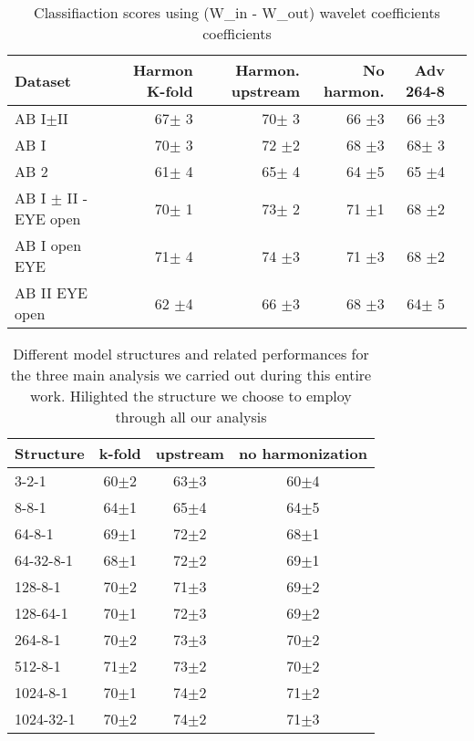 \documentclass[a4paper,11pt]{article}
\begin{document}
\begin{table}[!htp]\centering
\scriptsize
\begin{tabular}{lrrrrr}\toprule
Dataset &Harmon K-fold &Harmon. upstream &No harmon. &Adv 264-8 \\\midrule
AB I$\pm$II &67$\pm$ 3 &70$\pm$ 3 &66 $\pm$3 &66 $\pm$3 \\
AB I &70$\pm$ 3 &72 $\pm$2 &68 $\pm$3 &68$\pm$ 3 \\
AB 2 &61$\pm$ 4 &65$\pm$ 4 &64 $\pm$5 &65 $\pm$4 \\
AB I $\pm$ II - EYE open &70$\pm$ 1 &73$\pm$ 2 &71 $\pm$1 &68 $\pm$2 \\
AB I open EYE &71$\pm$ 4 &74 $\pm$3 &71 $\pm$3 &68 $\pm$2 \\
AB II EYE open &62 $\pm$4 &66 $\pm$3 &68 $\pm$3 &64$\pm$ 5 \\
\bottomrule
\end{tabular}
\caption{Classifiaction scores using (W\_in - W\_out) wavelet coefficients coefficients}
\label{tab:classification_win-wout}
\end{table}





\begin{table}[!htp]\centering
\begin{tabular}{lccc}
\toprule
Structure &k-fold &upstream &no harmonization \\
\midrule
3-2-1 &60$\pm$2 &63$\pm$3 &60$\pm$4 \\
8-8-1 &64$\pm$1 &65$\pm$4 &64$\pm$5 \\
64-8-1 &69$\pm$1 &72$\pm$2 &68$\pm$1 \\
64-32-8-1 &68$\pm$1 &72$\pm$2 &69$\pm$1 \\
128-8-1 &70$\pm$2 &71$\pm$3 &69$\pm$2 \\
128-64-1 &70$\pm$1 &72$\pm$3 &69$\pm$2 \\
\cellcolor[HTML]{ffff00}264-8-1 &\cellcolor[HTML]{ffff00}70$\pm$2 &\cellcolor[HTML]{ffff00}73$\pm$3 &\cellcolor[HTML]{ffff00}70$\pm$2 \\
512-8-1 &71$\pm$2 &73$\pm$2 &70$\pm$2 \\
1024-8-1 &70$\pm$1 &74$\pm$2 &71$\pm$2 \\
1024-32-1 &70$\pm$2 &74$\pm$2 &71$\pm$3 \\
\bottomrule
\end{tabular}
\caption{Different model structures and related performances for the three main analysis we carried out during this entire work. Hilighted the structure we choose to employ through all our analysis}\label{}
\end{table}




\end{document}
